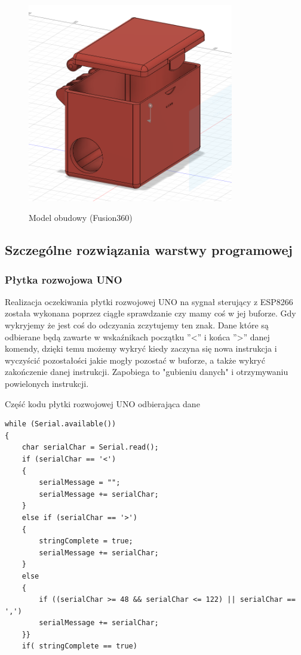 \documentclass[12pt]{article}
\begin{document}
\begin{figure}[!h]
	\begin{center}
		{\includegraphics[width=9cm]{obudowa_model.png}}
	\end{center}
	\caption{Model obudowy (Fusion360)}
\end{figure}

\newpage
\subsection{Szczególne rozwiązania warstwy programowej}
\subsubsection{Płytka rozwojowa UNO}
Realizacja oczekiwania płytki rozwojowej UNO na sygnał sterujący z ESP8266 została wykonana poprzez ciągłe sprawdzanie czy mamy coś w jej buforze. Gdy wykryjemy że jest coś do odczyania zczytujemy ten znak. Dane które są odbierane będą zawarte w wskaźnikach początku ''<'' i końca ''>'' danej komendy, dzięki temu możemy wykryć kiedy zaczyna się nowa instrukcja i wyczyścić pozostałości jakie mogły pozostać w buforze, a także wykryć zakończenie danej instrukcji. Zapobiega to "gubieniu danych" i otrzymywaniu powielonych instrukcji.
\begin{spverbatim}
	Część kodu płytki rozwojowej UNO odbierająca dane
\end{spverbatim}
\begin{lstlisting}
while (Serial.available()) 
{
	char serialChar = Serial.read(); 
	if (serialChar == '<')  
	{
		serialMessage = "";
		serialMessage += serialChar;
	}
	else if (serialChar == '>')
	{
		stringComplete = true;
		serialMessage += serialChar;
	}
	else
	{ 
		if ((serialChar >= 48 && serialChar <= 122) || serialChar == ',') 
		serialMessage += serialChar;
	}}
	if( stringComplete == true)
\end{lstlisting}
\end{document}
